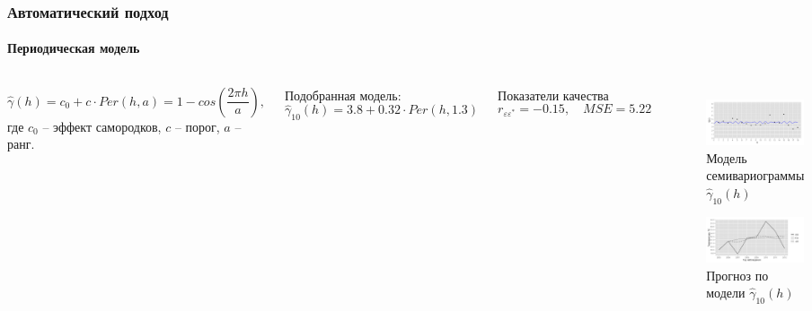 \documentclass[10pt,pdf,aspectratio=169,hyperref={unicode}]{beamer}
\begin{document}
\begin{frame}
  \frametitle{Автоматический подход}
  \framesubtitle{Периодическая модель}
  \begin{columns}[c]
  \column{3in}
  \begin{equation}
  \label{eq:per}
    \widehat{\gamma}(h) = c_0 + c \cdot Per(h, a) = 1 - cos(\frac{2 \pi h}{a}),
  \end{equation}
  где $ c_0 $ -- эффект самородков, $ c $ -- порог, $ a $ -- ранг.

  \vspace{0.5em}

  Подобранная модель:
  \begin{equation}
  \label{eq:gamma10}
    \widehat{\gamma}_{10}(h) = 3.8 + 0.32 \cdot Per(h, 1.3)
  \end{equation}

  Показатели качества
  \begin{equation*}
    r_{\varepsilon\varepsilon^{*}} = -0.15, \quad MSE = 5.22
  \end{equation*}

  \column{3in}
  \vspace{-14.5pt}
  \begin{figure}[H]
    \includegraphics[width=0.9\linewidth]{../../figures/variogram/auto-class-18-modeled.png} \\
    \caption{Модель семивариограммы $\widehat{\gamma}_{10}(h)$}
    \includegraphics[width=0.9\linewidth]{../../figures/variogram/auto-class-18-cross-prediction.png}
    \caption{Прогноз по модели $\widehat{\gamma}_{10}(h)$}
  \end{figure}
  \end{columns}
\end{frame}
\end{document}
